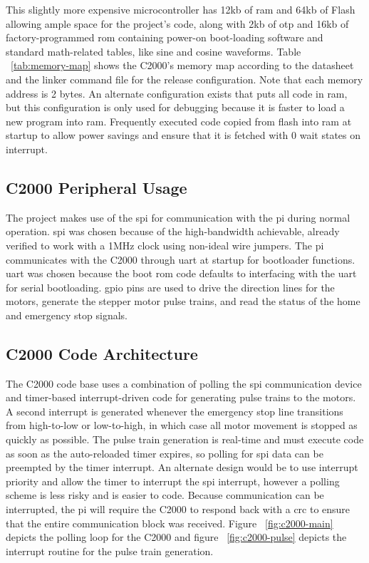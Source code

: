 This slightly more expensive microcontroller has 12\gls{kb} of \gls{ram} and 64\gls{kb} of Flash allowing ample space for the project's code, along with 2\gls{kb} of \gls{otp} and 16\gls{kb} of factory-programmed \gls{rom} containing power-on boot-loading software and standard math-related tables, like sine and cosine waveforms.
Table ~\ref{tab:memory-map} shows the C2000's memory map according to the datasheet\cite{piccolo} and the linker command file for the release configuration.
Note that each memory address is 2 bytes. 
An alternate configuration exists that puts all code in \gls{ram}, but this configuration is only used for debugging because it is faster to load a new program into \gls{ram}.
Frequently executed code copied from flash into \gls{ram} at startup to allow power savings and ensure that it is fetched with 0 wait states on interrupt.

\subsection{C2000 Peripheral Usage}
The project makes use of the \gls{spi} for communication with the \gls{pi} during normal operation.
\gls{spi} was chosen because of the high-bandwidth achievable, already verified to work with a 1MHz clock using non-ideal wire jumpers.
The \gls{pi} communicates with the C2000 through \gls{uart} at startup for bootloader functions.
\gls{uart} was chosen because the boot \gls{rom} code defaults to interfacing with the \gls{uart} for serial bootloading.
\gls{gpio} pins are used to drive the direction lines for the motors, generate the stepper motor pulse trains, and read the status of the home and emergency stop signals.

\subsection{C2000 Code Architecture}
The C2000 code base uses a combination of polling the \gls{spi} communication device and timer-based interrupt-driven code for generating pulse trains to the motors.
A second interrupt is generated whenever the emergency stop line transitions from high-to-low or low-to-high, in which case all motor movement is stopped as quickly as possible.
The pulse train generation is real-time and must execute code as soon as the auto-reloaded timer expires, so polling for \gls{spi} data can be preempted by the timer interrupt.
An alternate design would be to use interrupt priority and allow the timer to interrupt the \gls{spi} interrupt, however a polling scheme is less risky and is easier to code.
Because communication can be interrupted, the \gls{pi} will require the C2000 to respond back with a \gls{crc} to ensure that the entire communication block was received.
Figure ~\ref{fig:c2000-main} depicts the polling loop for the C2000 and figure ~\ref{fig:c2000-pulse} depicts the interrupt routine for the pulse train generation.

